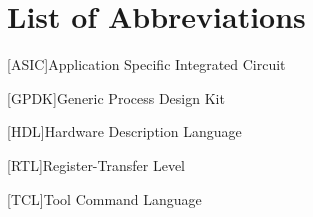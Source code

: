 \section*{List of Abbreviations}
\begin{acronym}
	[ASIC]{Application Specific Integrated Circuit}
		
	[GPDK]{Generic Process Design Kit}
		
	[HDL]{Hardware Description Language}
		
	[RTL]{Register-Transfer Level}
	
	[TCL]{Tool Command Language}
\end{acronym}


